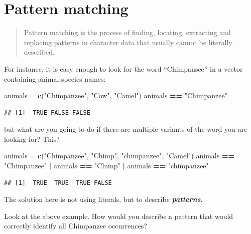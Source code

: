 \documentclass[]{book}
\newenvironment{Shaded}{\begin{snugshade}}{\end{snugshade}}
\newcommand{\KeywordTok}[1]{\textcolor[rgb]{0.13,0.29,0.53}{\textbf{#1}}}
\newcommand{\NormalTok}[1]{#1}
\newcommand{\OperatorTok}[1]{\textcolor[rgb]{0.81,0.36,0.00}{\textbf{#1}}}
\newcommand{\StringTok}[1]{\textcolor[rgb]{0.31,0.60,0.02}{#1}}
\begin{document}
\hypertarget{pattern-matching}{%
\section{Pattern matching}\label{pattern-matching}}

\begin{quote}
Pattern matching is the process of finding, locating, extracting and replacing patterns in character data that usually cannot be literally described.
\end{quote}

For instance, it is easy enough to look for the word ``Chimpansee'' in a vector containing animal species names:

\begin{Shaded}
\begin{Highlighting}[]
\NormalTok{animals =}\StringTok{ }\KeywordTok{c}\NormalTok{(}\StringTok{"Chimpanzee"}\NormalTok{, }\StringTok{"Cow"}\NormalTok{, }\StringTok{"Camel"}\NormalTok{)}
\NormalTok{animals }\OperatorTok{==}\StringTok{ "Chimpanzee"}
\end{Highlighting}
\end{Shaded}

\begin{verbatim}
## [1]  TRUE FALSE FALSE
\end{verbatim}

but what are you going to do if there are multiple variants of the word you are looking for? This?

\begin{Shaded}
\begin{Highlighting}[]
\NormalTok{animals =}\StringTok{ }\KeywordTok{c}\NormalTok{(}\StringTok{"Chimpanzee"}\NormalTok{, }\StringTok{"Chimp"}\NormalTok{, }\StringTok{"chimpanzee"}\NormalTok{, }\StringTok{"Camel"}\NormalTok{)}
\NormalTok{animals }\OperatorTok{==}\StringTok{ "Chimpanzee"} \OperatorTok{|}\StringTok{ }\NormalTok{animals }\OperatorTok{==}\StringTok{ "Chimp"} \OperatorTok{|}\StringTok{ }\NormalTok{animals }\OperatorTok{==}\StringTok{ "chimpanzee"}
\end{Highlighting}
\end{Shaded}

\begin{verbatim}
## [1]  TRUE  TRUE  TRUE FALSE
\end{verbatim}

The solution here is not using literals, but to describe \textbf{\emph{patterns}}.

Look at the above example. How would you describe a pattern that would correctly identify all Chimpanzee occurrences?
\end{document}
